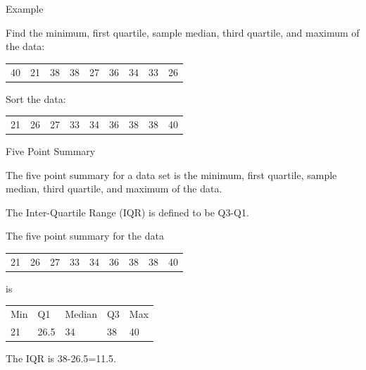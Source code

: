 \begin{frame}{Example}

  Find the minimum, first quartile, sample median, third quartile, and
  maximum of the data:\\
  \begin{tabular}{lllllllll}
    40 & 21 & 38 & 38 & 27 & 36 & 34 & 33 & 26
  \end{tabular}

  {
    \vfill
    Sort the data: \\
    \begin{tabular}{lllllllll}
      21 & 26 & 27 & 33 & 34 & 36 & 38 & 38 & 40
    \end{tabular}
  }

  \vfill
  
\end{frame}


\begin{frame}{Five Point Summary}

  \begin{definition}

    The five point summary for a data set is the minimum, first
    quartile, sample median, third quartile, and maximum of the data.
    
  \end{definition}

  \begin{definition}

    The Inter-Quartile Range (IQR) is defined to be Q3-Q1.
    
  \end{definition}




  {
    The five point summary for the data \
    \begin{tabular}{lllllllll}
      21 & 26 & 27 & 33 & 34 & 36 & 38 & 38 & 40
    \end{tabular}
    is \\
    \begin{tabular}{lllll}
      Min & Q1   & Median & Q3 & Max \\
      21  & 26.5 & 34     & 38 & 40
    \end{tabular}

    The IQR is 38-26.5=11.5.
  }

  
\end{frame}


